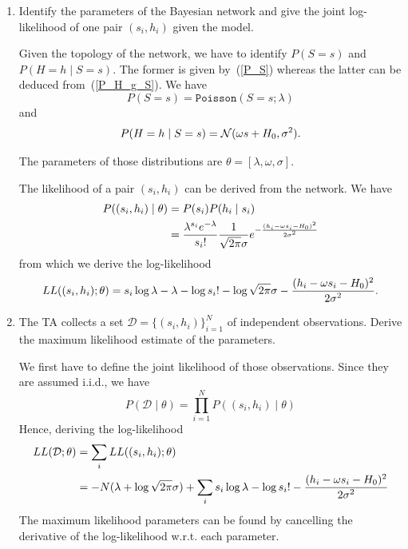 \documentclass[11pt, a4paper]{article}
\begin{document}
\begin{enumerate}
    \item Identify the parameters of the Bayesian network and give the joint log-likelihood of one pair $(s_i, h_i)$ given the model.
    
    \begin{solution}
    Given the topology of the network, we have to identify $P(S=s)$ and $P(H = h \mid S = s)$. The former is given by~(\ref{P_S}) whereas the latter can be deduced from~(\ref{P_H_g_S}). We have 
    \begin{equation*}
        P(S = s) = \texttt{Poisson}(S=s;\lambda)
    \end{equation*}
    and
    \begin{equation*}
        P(H = h \mid S = s) = \mathcal{N}(\omega s + H_0, \text{$\sigma^2$}).
    \end{equation*}

    The parameters of those distributions are $\theta = [\lambda,   \omega,  \sigma]$.
    
    The likelihood of a pair $(s_i, h_i)$ can be derived from the network. We have 
    \begin{align*}
        P((s_i,h_i)\mid \theta) &= P(s_i)P(h_i \mid s_i)\\
        &= \dfrac{\lambda ^{s_i} e^{-\lambda}}{s_i!} \dfrac{1}{\sqrt{2\pi}\sigma}e^{-\frac{(h_i - \omega s_i - H_0)^2}{2\text{$\sigma^2$}}}
    \end{align*}
    from which we derive the log-likelihood
    \begin{equation}
        LL((s_i,h_i);\theta) = s_i \log{\lambda} - \lambda - \log{s_i!} - \log{\sqrt{2\pi}\sigma} - \dfrac{(h_i - \omega s_i - H_0)^2}{2\text{$\sigma^2$}}.
    \end{equation}
    \end{solution}
    \item The TA collects a set $\mathcal{D} = \{(s_i,h_i)\}_{i=1}^N$ of independent observations. Derive the maximum likelihood estimate of the parameters.

    \begin{solution}
        We first have to define the joint likelihood of those observations. Since they are assumed i.i.d., we have 
        $$
        P(\mathcal{D}\mid \theta) = \prod_{i=1}^N P((s_i,h_i)\mid \theta)
        $$
        Hence, deriving the log-likelihood
        \begin{align*}
        LL(\mathcal{D};\theta) &= \sum_i LL((s_i,h_i);\theta)\\
        &= -N(\lambda + \log{\sqrt{2\pi}\sigma}) + \sum_i s_i \log{\lambda} - \log{s_i!} - \dfrac{(h_i - \omega s_i - H_0)^2}{2\text{$\sigma^2$}}
        \end{align*}
        The maximum likelihood parameters can be found by cancelling the derivative of the log-likelihood w.r.t. each parameter.
        

\end{solution}
\end{enumerate}
\end{document}
